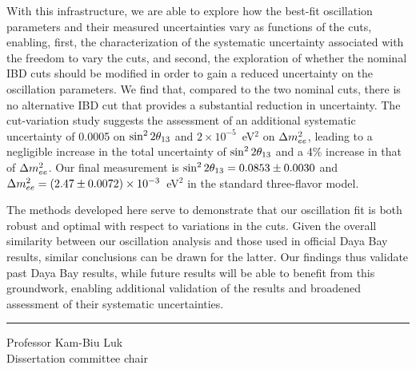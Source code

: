 With this infrastructure, we are able to explore how the best-fit oscillation parameters and their measured uncertainties vary as functions of the cuts, enabling, first, the characterization of the systematic uncertainty associated with the freedom to vary the cuts, and second, the exploration of whether the nominal IBD cuts should be modified in order to gain a reduced uncertainty on the oscillation parameters. We find that, compared to the two nominal cuts, there is no alternative IBD cut that provides a substantial reduction in uncertainty. The cut-variation study suggests the assessment of an additional systematic uncertainty of 0.0005 on $\sin^2 2\theta_{13}$ and $2\times10^{-5}$~eV$^2$ on $\Delta m^2_{ee}$, leading to a negligible increase in the total uncertainty of $\sin^2 2\theta_{13}$ and a 4\% increase in that of $\Delta m^2_{ee}$. Our final measurement is $\sin^2 2\theta_{13} = 0.0853 \pm 0.0030$ and $\Delta m^2_{ee} = (2.47 \pm 0.0072) \times 10^{-3}$~eV$^2$ in the standard three-flavor model.

The methods developed here serve to demonstrate that our oscillation fit is both robust and optimal with respect to variations in the cuts. Given the overall similarity between our oscillation analysis and those used in official Daya Bay results, similar conclusions can be drawn for the latter. Our findings thus validate past Daya Bay results, while future results will be able to benefit from this groundwork, enabling additional validation of the results and broadened assessment of their systematic uncertainties.

%

\SingleSpacing
\vspace{2.5\baselineskip}
\hfill
\begin{minipage}{0.4\textwidth}
  \hrule\vspace{0.4\baselineskip}
  Professor Kam-Biu Luk\\
  Dissertation committee chair
\end{minipage}

\clearpage